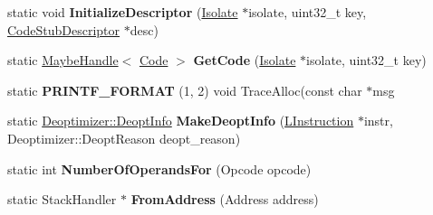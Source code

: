 \begin{DoxyCompactItemize}
\item 
static void {\bfseries Initialize\+Descriptor} (\hyperlink{classv8_1_1internal_1_1_isolate}{Isolate} $\ast$isolate, uint32\+\_\+t key, \hyperlink{classv8_1_1internal_1_1_code_stub_descriptor}{Code\+Stub\+Descriptor} $\ast$desc)\hypertarget{classv8_1_1internal_1_1_b_a_s_e___e_m_b_e_d_d_e_d_a54d762f4ee1b78aebcbb68e88aac61d5}{}\label{classv8_1_1internal_1_1_b_a_s_e___e_m_b_e_d_d_e_d_a54d762f4ee1b78aebcbb68e88aac61d5}

\item 
static \hyperlink{classv8_1_1internal_1_1_maybe_handle}{Maybe\+Handle}$<$ \hyperlink{classv8_1_1internal_1_1_code}{Code} $>$ {\bfseries Get\+Code} (\hyperlink{classv8_1_1internal_1_1_isolate}{Isolate} $\ast$isolate, uint32\+\_\+t key)\hypertarget{classv8_1_1internal_1_1_b_a_s_e___e_m_b_e_d_d_e_d_ae6038222227372ad515cafaf5c1a4ce2}{}\label{classv8_1_1internal_1_1_b_a_s_e___e_m_b_e_d_d_e_d_ae6038222227372ad515cafaf5c1a4ce2}

\item 
static {\bfseries P\+R\+I\+N\+T\+F\+\_\+\+F\+O\+R\+M\+AT} (1, 2) void Trace\+Alloc(const char $\ast$msg\hypertarget{classv8_1_1internal_1_1_b_a_s_e___e_m_b_e_d_d_e_d_a8d705d2f93f6e41f45d5c4567a650d90}{}\label{classv8_1_1internal_1_1_b_a_s_e___e_m_b_e_d_d_e_d_a8d705d2f93f6e41f45d5c4567a650d90}

\item 
static \hyperlink{structv8_1_1internal_1_1_deoptimizer_1_1_deopt_info}{Deoptimizer\+::\+Deopt\+Info} {\bfseries Make\+Deopt\+Info} (\hyperlink{classv8_1_1internal_1_1_l_instruction}{L\+Instruction} $\ast$instr, Deoptimizer\+::\+Deopt\+Reason deopt\+\_\+reason)\hypertarget{classv8_1_1internal_1_1_b_a_s_e___e_m_b_e_d_d_e_d_ae072e326c370a6c0fc11f06f3885210e}{}\label{classv8_1_1internal_1_1_b_a_s_e___e_m_b_e_d_d_e_d_ae072e326c370a6c0fc11f06f3885210e}

\item 
static int {\bfseries Number\+Of\+Operands\+For} (Opcode opcode)\hypertarget{classv8_1_1internal_1_1_b_a_s_e___e_m_b_e_d_d_e_d_a50eb80716ea402d1b337603fbc130aa8}{}\label{classv8_1_1internal_1_1_b_a_s_e___e_m_b_e_d_d_e_d_a50eb80716ea402d1b337603fbc130aa8}

\item 
static Stack\+Handler $\ast$ {\bfseries From\+Address} (Address address)\hypertarget{classv8_1_1internal_1_1_b_a_s_e___e_m_b_e_d_d_e_d_ad60d5f2c3fd7d1f326b647b47598261d}{}\label{classv8_1_1internal_1_1_b_a_s_e___e_m_b_e_d_d_e_d_ad60d5f2c3fd7d1f326b647b47598261d}


\end{DoxyCompactItemize}
